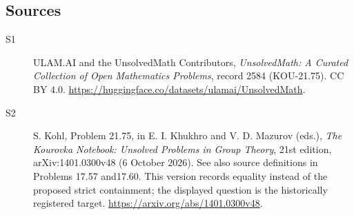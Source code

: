 \documentclass[11pt]{article}
\begin{document}
\subsection{Sources}
\begin{description}
\item[\hypertarget{source:2584:1}{S1}] ULAM.AI and the UnsolvedMath Contributors, \emph{UnsolvedMath: A Curated Collection of Open Mathematics Problems}, record 2584 (KOU-21.75). CC BY 4.0. \url{https://huggingface.co/datasets/ulamai/UnsolvedMath}.
\item[\hypertarget{source:2584:2}{S2}] S. Kohl, Problem 21.75, in E. I. Khukhro and V. D. Mazurov (eds.), \emph{The Kourovka Notebook: Unsolved Problems in Group Theory}, 21st edition, arXiv:1401.0300v48 (6 October 2026). See also source definitions in Problems 17.57 and17.60. This version records equality instead of the proposed strict containment; the displayed question is the historically registered target. \url{https://arxiv.org/abs/1401.0300v48}.
\end{description}
\label{end:2584}
\end{document}
